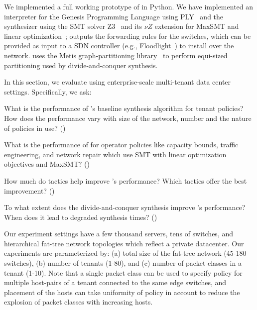 We implemented a full working
prototype of \Name in Python. We have implemented an interpreter for
the Genesis Programming Language using PLY~\cite{ply} and the synthesizer using 
the SMT solver Z3~\cite{z3} and its $\nu Z$ extension for MaxSMT and linear
 optimization~\cite{nuz3}; \name outputs the
forwarding rules for the switches, which can be provided as input to a
SDN controller (e.g., Floodlight~\cite{floodlight}) to install over the
network. \Name uses the Metis graph-partitioning library~\cite{metis}
to perform equi-sized partitioning 
used by divide-and-conquer synthesis. 

In this section, we evaluate \Name using
enterprise-scale multi-tenant data
center settings. 
Specifically, we ask:
\begin{compactitemize}
\item What is the performance of \Name's baseline synthesis
  algorithm for tenant policies? How does the performance vary with size of the
  network, number and the nature of policies in use? ()
  
  \item What is the performance of \name for operator policies
  like capacity bounds, traffic engineering, and network repair
  which use SMT with linear optimization objectives and MaxSMT? ()

\item How much do tactics help improve \Name's 
  performance? Which tactics offer the best improvement? ()

\item To what extent does the divide-and-conquer synthesis improve \Name's
  performance? When does it lead to degraded synthesis times? ()

\end{compactitemize}
Our experiment settings have a few thousand servers, tens of switches,
and hierarchical fat-tree network topologies which reflect a private
datacenter. Our experiments are parameterized by: (a) total size of
the fat-tree network (45-180 switches), (b) number of
tenants (1-80), and (c) number of packet classes in a tenant (1-10).
Note that a single packet class can be used to specify policy
for multiple host-pairs of a tenant connected to the 
same edge switches, and placement of the hosts can take uniformity
of policy in account to reduce the explosion of packet classes with 
increasing hosts.

